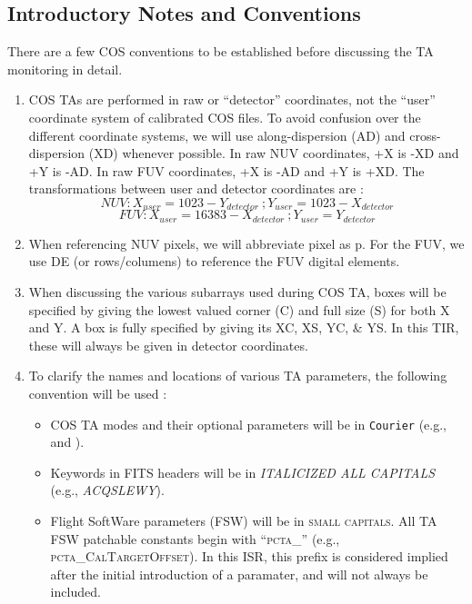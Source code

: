 \subsection{Introductory Notes and Conventions}\label{subsec:conventions}
There are a few COS conventions to be established before discussing the TA monitoring in detail.
\begin{enumerate}
	\item{COS TAs are performed in raw or ``detector'' coordinates, not the ``user'' coordinate system of calibrated
		COS files. To avoid confusion over the different coordinate systems, we will use along-dispersion (AD) and cross-dispersion (XD) whenever possible.
		In raw NUV coordinates, +X is -XD and +Y is -AD. In raw FUV coordinates, +X is -AD and +Y is +XD.
		The transformations between user and detector coordinates are :
		\begin{equation} NUV: X_{user} = 1023 - Y_{detector} \ ; Y_{user} = 1023 - X_{detector} \end{equation}
		\begin{equation} FUV: X_{user} = 16383 - X_{detector} \ ; Y_{user} = Y_{detector} \end{equation}
		}
	\item{When referencing NUV pixels, we will abbreviate pixel as p. For the FUV, we use DE (or rows/columens) to reference the FUV digital elements.}
	\item{When discussing the various subarrays used during COS TA, boxes will be specified by giving the lowest
		valued corner (C) and full size (S) for both X and Y. A box is fully specified by giving its XC, XS, YC, \& YS. In this TIR, these will always be given in detector coordinates.}
	\item{To clarify the names and locations of various TA parameters, the following convention will be used :
		\begin{itemize}
			\item{COS TA modes and their optional parameters will be in \texttt{Courier} (e.g.,  and \numpos).}
			\item{Keywords in FITS headers will be in \textit{ITALICIZED ALL CAPITALS} (e.g., \textit{ACQSLEWY}).}
			\item{Flight SoftWare parameters (FSW) will be in \textsc{small capitals}.
All TA FSW patchable constants begin with ``\textsc{pcta\_}'' (e.g., \textsc{pcta\_CalTargetOffset}). In this ISR, this prefix is considered implied after the initial introduction of a paramater, and will not always be included.
}
\end{itemize}}
\end{enumerate}
